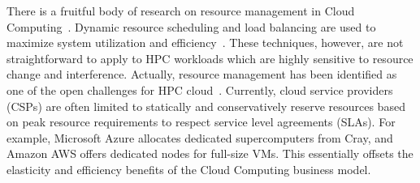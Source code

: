 There is a fruitful body of research on resource management in 
Cloud Computing~\cite{singh2016survey,zhan2015cloud,gill2018chopper}. Dynamic resource scheduling and 
load balancing are used 
to maximize system utilization and efficiency~\cite{adhikari2018heuristic,panwar2015load}. These techniques, however, 
are not straightforward to apply to HPC workloads which are highly sensitive to resource change and interference. 
Actually, resource management has been identified as one of the open 
challenges for HPC cloud~\cite{netto2018hpc}. 
Currently, cloud service providers (CSPs) are often limited to statically and conservatively reserve 
resources based on peak resource requirements to respect service level agreements (SLAs). For example, Microsoft Azure 
allocates dedicated supercomputers from Cray, and Amazon AWS offers dedicated nodes for full-size VMs. 
This essentially offsets 
the elasticity and efficiency benefits of the Cloud Computing business model. 